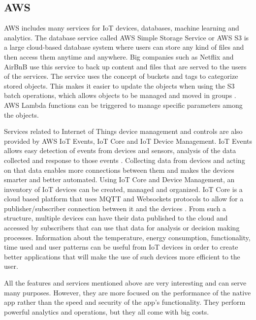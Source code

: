 \documentclass{article}
\begin{document}
\subsection{AWS}
AWS includes many services for IoT devices, databases, machine learning and analytics. The database service called AWS Simple Storage Service or AWS S3 is a large cloud-based database system where users can store any kind of files and then access them anytime and anywhere. Big companies such as Netflix and AirBnB use this service to back up content and files that are served to the users of the services. The service uses the concept of buckets and tags to categorize stored objects. This makes it easier to update the objects when using the S3 batch operations, which allows objects to be managed and moved in groups \cite{AWS}. AWS Lambda functions can be triggered to manage specific parameters among the objects. \newline

Services related to Internet of Things device management and controls are also provided by AWS IoT Events, IoT Core and IoT Device Management. IoT Events allows easy detection of events from devices and sensors, analysis of the data collected and response to those events \cite{AWSIoT}. Collecting data from devices and acting on that data enables more connections between them and makes the devices smarter and better automated. Using IoT Core and Device Management, an inventory of IoT devices can be created, managed and organized. IoT Core is a cloud based platform that uses MQTT and Websockets protocols to allow for a publisher/subscriber connection between it and the devices \cite{AWSIoTCore}. From such a structure, multiple devices can have their data published to the cloud and accessed by subscribers that can use that data for analysis or decision making processes. Information about the temperature, energy consumption, functionality, time used and user patterns can be useful from IoT devices in order to create  better applications that will make the use of such devices more efficient to the user. \newline

All the features and services mentioned above are very interesting and can serve many purposes. However, they are more focused on the performance of the native app rather than the speed and security of the app’s functionality. They perform powerful analytics and operations, but they all come with big costs.
\end{document}
